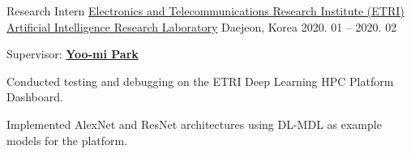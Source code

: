 \documentclass[11pt, a4paper]{cv}
\begin{document}
\begin{cventries}
  \cvexperience
    {Research Intern} %
    {\href{https://etri.re.kr/eng/main/main.etri}{Electronics and Telecommunications Research Institute (ETRI)}} %
    {\href{https://etri.re.kr/eng/sub6/sub6_0101.etri?departCode=10}{Artificial Intelligence Research Laboratory}} %
    {Daejeon, Korea} %
    {2020. 01 -- 2020. 02} %
    {
      \begin{cvitems} %
        \item {Supervisor: \href{https://kr.linkedin.com/in/yoomipark-etri}{\bfseries\color{graytext} Yoo-mi Park}}
        \item {Conducted testing and debugging on the ETRI Deep Learning HPC Platform Dashboard.}
        \item {Implemented AlexNet and ResNet architectures using DL-MDL as example models for the platform.}
      \end{cvitems}
    }

\end{cventries}
\end{document}
